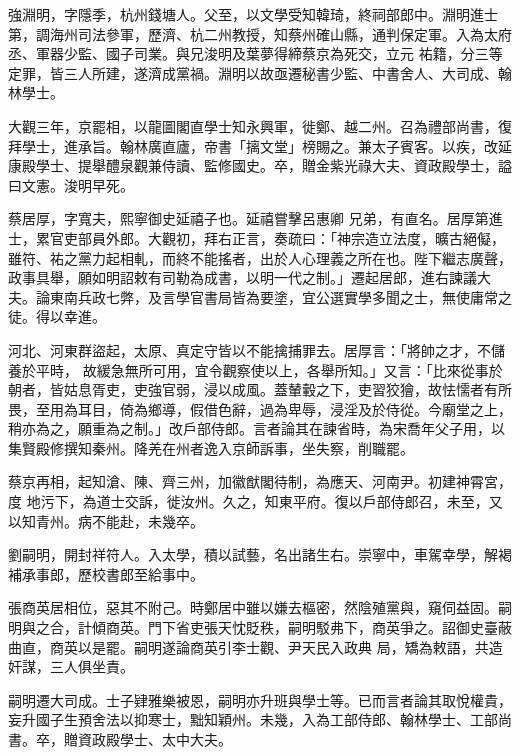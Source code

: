 \begin{pinyinscope}
 強淵明，字隱季，杭州錢塘人。父至，以文學受知韓琦，終祠部郎中。淵明進士第，調海州司法參軍，歷濟、杭二州教授，知蔡州確山縣，通判保定軍。入為太府丞、軍器少監、國子司業。與兄浚明及葉夢得締蔡京為死交，立元
 祐籍，分三等定罪，皆三人所建，遂濟成黨禍。淵明以故亟遷秘書少監、中書舍人、大司成、翰林學士。



 大觀三年，京罷相，以龍圖閣直學士知永興軍，徙鄭、越二州。召為禮部尚書，復拜學士，進承旨。翰林廣直廬，帝書「摛文堂」榜賜之。兼太子賓客。以疾，改延康殿學士、提舉醴泉觀兼侍讀、監修國史。卒，贈金紫光祿大夫、資政殿學士，謚曰文憲。浚明早死。



 蔡居厚，字寬夫，熙寧御史延禧子也。延禧嘗擊呂惠卿
 兄弟，有直名。居厚第進士，累官吏部員外郎。大觀初，拜右正言，奏疏曰：「神宗造立法度，曠古絕儗，雖符、祐之黨力起相軋，而終不能搖者，出於人心理義之所在也。陛下繼志廣聲，政事具舉，願如明詔敕有司勒為成書，以明一代之制。」遷起居郎，進右諫議大夫。論東南兵政七弊，及言學官書局皆為要塗，宜公選實學多聞之士，無使庸常之徒。得以幸進。



 河北、河東群盜起，太原、真定守皆以不能擒捕罪去。居厚言：「將帥之才，不儲養於平時，
 故緩急無所可用，宜令觀察使以上，各舉所知。」又言：「比來從事於朝者，皆姑息胥吏，吏強官弱，浸以成風。蓋輦轂之下，吏習狡獪，故怯懦者有所畏，至用為耳目，倚為鄉導，假借色辭，過為卑辱，浸淫及於侍從。今廟堂之上，稍亦為之，願重為之制。」改戶部侍郎。言者論其在諫省時，為宋喬年父子用，以集賢殿修撰知秦州。降羌在州者逸入京師訴事，坐失察，削職罷。



 蔡京再相，起知滄、陳、齊三州，加徽猷閣待制，為應天、河南尹。初建神霄宮，度
 地污下，為道士交訴，徙汝州。久之，知東平府。復以戶部侍郎召，未至，又以知青州。病不能赴，未幾卒。



 劉嗣明，開封祥符人。入太學，積以試藝，名出諸生右。崇寧中，車駕幸學，解褐補承事郎，歷校書郎至給事中。



 張商英居相位，惡其不附己。時鄭居中雖以嫌去樞密，然陰殖黨與，窺伺益固。嗣明與之合，計傾商英。門下省吏張天忱貶秩，嗣明駁弗下，商英爭之。詔御史臺蔽曲直，商英以是罷。嗣明遂論商英引李士觀、尹天民入政典
 局，矯為敕語，共造奸謀，三人俱坐責。



 嗣明遷大司成。士子肄雅樂被恩，嗣明亦升班與學士等。已而言者論其取悅權貴，妄升國子生預舍法以抑寒士，黜知穎州。未幾，入為工部侍郎、翰林學士、工部尚書。卒，贈資政殿學士、太中大夫。




\end{pinyinscope}
